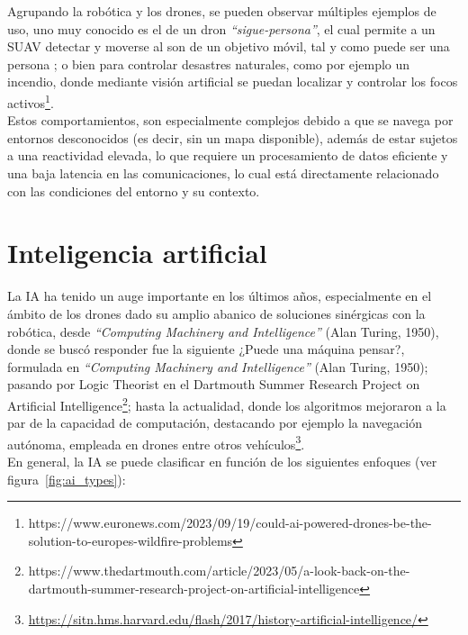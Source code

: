 Agrupando la robótica y los drones, se pueden observar múltiples ejemplos de uso, uno muy conocido es el de un dron \emph{``sigue-persona''}, el cual permite a un \ac{SUAV} detectar y moverse al son de un objetivo móvil, tal y como puede ser una persona \cite{8967675}; o bien para controlar desastres naturales, como por ejemplo un incendio, donde mediante visión artificial se puedan localizar y controlar los focos activos\footnote[13]{https://www.euronews.com/2023/09/19/could-ai-powered-drones-be-the-solution-to-europes-wildfire-problems}.\\

Estos comportamientos, son especialmente complejos debido a que se navega por entornos desconocidos (es decir, sin un mapa disponible), además de estar sujetos a una reactividad elevada, lo que requiere un procesamiento de datos eficiente y una baja latencia en las comunicaciones, lo cual está directamente relacionado con las condiciones del entorno y su contexto.

\section{Inteligencia artificial}
\label{subsec:inteligencia_artificial}

La \ac{IA} ha tenido un auge importante en los últimos años, especialmente en el ámbito de los drones dado su amplio abanico de soluciones sinérgicas con la robótica, desde \emph{``Computing Machinery and Intelligence''} (Alan Turing, 1950), donde se buscó responder fue la siguiente ¿Puede una máquina pensar?, formulada en \emph{``Computing Machinery and Intelligence''} (Alan Turing, 1950); pasando por Logic Theorist en el Dartmouth Summer Research Project on Artificial Intelligence\footnote[14]{https://www.thedartmouth.com/article/2023/05/a-look-back-on-the-dartmouth-summer-research-project-on-artificial-intelligence}; hasta la actualidad, donde los algoritmos mejoraron a la par de la capacidad de computación, destacando por ejemplo la navegación autónoma, empleada en drones entre otros vehículos\footnote[15]{\url{https://sitn.hms.harvard.edu/flash/2017/history-artificial-intelligence/}}.\\

En general, la \ac{IA} se puede clasificar en función de los siguientes enfoques (ver figura~\ref{fig:ai_types}):

